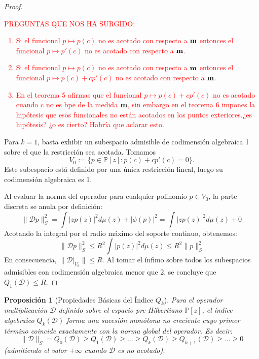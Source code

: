 \documentclass[12pt,a4paper]{article}
\newtheorem{proposition}{Proposición}
\theoremstyle{definition}
\theoremstyle{remark}
\begin{document}
\begin{proof}
\textcolor{red}{PREGUNTAS QUE NOS HA SURGIDO: 
\begin{enumerate}
\item Si el funcional $p \mapsto p(c)$ no es acotado con respecto a ${\bf m}$ entonces el funcional $p \mapsto p'(c)$ no es acotado con respecto a ${\bf m}$.
\item Si el funcional $p \mapsto p(c)$ no es acotado con respecto a ${\bf m}$ entonces el funcional $p \mapsto p(c)+cp'(c)$ no es acotado con respecto a ${\bf m}$.
\item En el teorema 5 afirmas que el funcional  $p \mapsto p(c)+cp'(c)$ no es acotado cuando c no es bpe de la medida ${\bf m}$, sin embargo en el teorema 6 impones la hipótesis que esos funcionales no están acotados en los puntos exteriores.¿es hipótesis? ¿o es cierto? Habría que aclarar esto. 
\end{enumerate}
}



	Para $k=1$, basta exhibir un subespacio admisible de codimensión algebraica 1 sobre el que la restricción sea acotada. Tomamos
	\[
		V_0:=\{p\in\mathbb{P}[z]:p(c)+cp'(c)=0\}.
	\]
	Este subespacio está definido por una única restricción lineal, luego su codimensión algebraica es 1.

	Al evaluar la norma del operador para cualquier polinomio $p \in V_0$, la parte discreta se anula por definición:
	$$ \|\mathcal{D}p\|_S^2 = \int |zp(z)|^2 d\mu(z) + |\phi(p)|^2 = \int |zp(z)|^2 d\mu(z) + 0 $$
	Acotando la integral por el radio máximo del soporte continuo, obtenemos:
	$$ \|\mathcal{D}p\|_S^2 \le R^2 \int |p(z)|^2 d\mu(z) \le R^2 \|p\|_S^2 $$
	En consecuencia, $\|\mathcal{D}|_{V_0}\| \le R$. Al tomar el ínfimo sobre todos los subespacios admisibles con codimensión algebraica menor que 2, se concluye que $Q_1(\mathcal{D}) \le R$.
\end{proof}

\begin{proposition}[Propiedades Básicas del Índice $Q_k$]\label{prop:propiedades_Qk}
	Para el operador multiplicación $\mathcal{D}$ definido sobre el espacio pre-Hilbertiano $\mathbb{P}[z]$, el índice algebraico $Q_k(\mathcal{D})$ forma una sucesión monótona no creciente cuyo primer término coincide exactamente con la norma global del operador. Es decir:
	$$ \|\mathcal{D}\|_S = Q_0(\mathcal{D}) \ge Q_1(\mathcal{D}) \ge \dots \ge Q_k(\mathcal{D}) \ge Q_{k+1}(\mathcal{D}) \ge \dots \ge 0 $$
	(admitiendo el valor $+\infty$ cuando $\mathcal{D}$ es no acotado).
\end{proposition}
\end{document}
